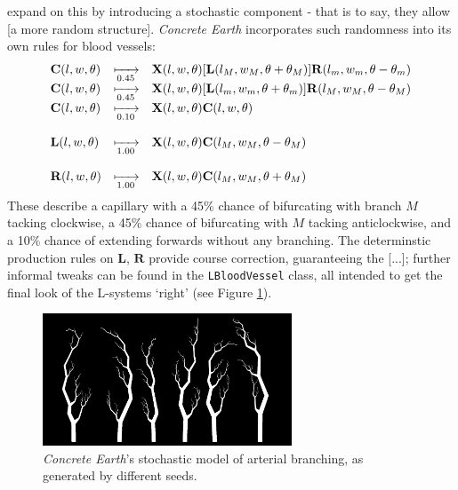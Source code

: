 \documentclass[a4paper, 11pt]{article}
\begin{document}
\begin{flushleft}
\vspace{5pt}\noindent
\citet{liuSimulationBloodVessels} expand on this by introducing a stochastic component - that is to say, they allow [a more random structure]. \textit{Concrete Earth} incorporates such randomness into its own rules for blood vessels:
$$\begin{matrix*}[l]
\mathbf{C}(l,w,\theta) &\xmapsto[0.45]{} &\mathbf{X}(l,w,\theta)[\mathbf{L}(l_M,w_M,\theta+\theta_M)]\mathbf{R}(l_m,w_m,\theta-\theta_m) \\
\mathbf{C}(l,w,\theta) &\xmapsto[0.45]{} &\mathbf{X}(l,w,\theta)[\mathbf{L}(l_m,w_m,\theta+\theta_m)]\mathbf{R}(l_M,w_M,\theta-\theta_M) \\
\mathbf{C}(l,w,\theta) &\xmapsto[0.10]{} &\mathbf{X}(l,w,\theta)\mathbf{C}(l,w,\theta) \\
& & \\
\mathbf{L}(l,w,\theta) &\xmapsto[1.00]{} &\mathbf{X}(l,w,\theta)\mathbf{C}(l_M,w_M,\theta-\theta_M) \\
& & \\
\mathbf{R}(l,w,\theta) &\xmapsto[1.00]{} &\mathbf{X}(l,w,\theta)\mathbf{C}(l_M,w_M,\theta+\theta_M)
\end{matrix*}$$
These describe a capillary with a 45\% chance of bifurcating with branch $M$ tacking clockwise, a 45\% chance of bifurcating with $M$ tacking anticlockwise, and a 10\% chance of extending forwards without any branching. The determinstic production rules on $\mathbf{L}$, $\mathbf{R}$ provide course correction, guaranteeing the [...]; further informal tweaks can be found in the \texttt{LBloodVessel} class, all intended to get the final look of the L-systems `right' (see Figure \ref{Blood Vessels}). 

\vspace{5pt}\noindent
\begin{figure}[h]
\centering
\includegraphics[width=0.66\textwidth]{Blood Vessels}
\caption{\textit{Concrete Earth}'s stochastic model of arterial branching, as generated by different seeds.}
\label{Blood Vessels}
\end{figure}



\end{flushleft}
\end{document}
